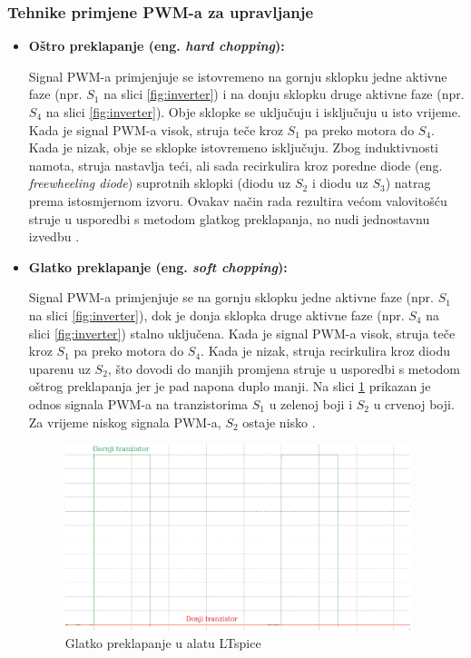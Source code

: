 \documentclass[diplomskirad]{fer}
\begin{document}
\subsubsection{Tehnike primjene PWM-a za upravljanje}
\begin{itemize}

	\item \textbf{Oštro preklapanje (eng. \textit{hard chopping}):}

	      Signal PWM-a primjenjuje se istovremeno na gornju sklopku jedne aktivne faze
	      (npr. $S_1$ na slici \ref{fig:inverter}) i na donju sklopku druge aktivne faze
	      (npr. $S_4$ na slici \ref{fig:inverter}). Obje sklopke se uključuju i
	      isključuju u isto vrijeme. Kada je signal PWM-a visok, struja teče kroz $S_1$
	      pa preko motora do $S_4$. Kada je nizak, obje se sklopke istovremeno
	      isključuju. Zbog induktivnosti namota, struja nastavlja teći, ali sada
	      recirkulira kroz poredne diode (eng. \textit{freewheeling diode}) suprotnih
	      sklopki (diodu uz $S_2$ i diodu uz $S_3$) natrag prema istosmjernom izvoru.
	      Ovakav način rada rezultira većom valovitošću struje u usporedbi s metodom
	      glatkog preklapanja, no nudi jednostavnu izvedbu \cite{TI2015}.

	\item \textbf{Glatko preklapanje (eng. \textit{soft chopping}):}

	      Signal PWM-a primjenjuje se na gornju sklopku jedne aktivne faze (npr. $S_1$ na
	      slici \ref{fig:inverter}), dok je donja sklopka druge aktivne faze (npr. $S_4$
	      na slici \ref{fig:inverter}) stalno uključena. Kada je signal PWM-a visok,
	      struja teče kroz $S_1$ pa preko motora do $S_4$. Kada je nizak, struja
	      recirkulira kroz diodu uparenu uz $S_2$, što dovodi do manjih promjena struje u
	      usporedbi s metodom oštrog preklapanja jer je pad napona duplo manji. Na slici
	      \ref{fig:hard_chopping} prikazan je odnos signala PWM-a na tranzistorima $S_1$
	      u zelenoj boji i $S_2$ u crvenoj boji. Za vrijeme niskog signala PWM-a, $S_2$
	      ostaje nisko \cite{TI2015}. 
	      \begin{figure}[h!]
		      \centering
		      \includegraphics[width=0.95\textwidth]{Figures/hard_chopping1.png}
		      \caption{Glatko preklapanje u alatu LTspice}
		      \label{fig:hard_chopping}
	      \end{figure}


\end{itemize}
\end{document}
